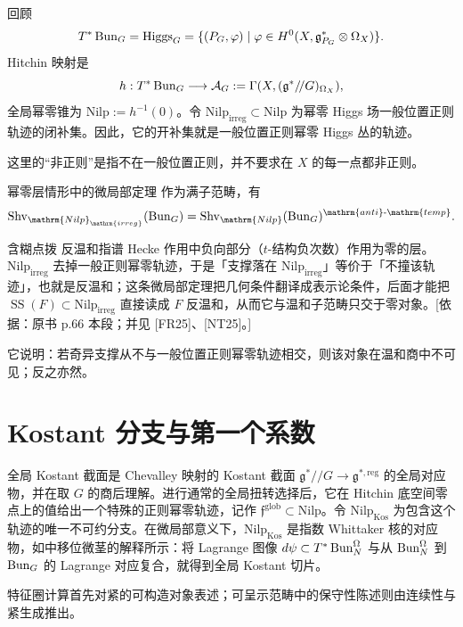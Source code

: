 回顾
\[T^*\operatorname{Bun}_G=\operatorname{Higgs}_G=\{(P_G,\varphi)\mid\varphi\in H^0(X,\mathfrak g_{P_G}^*\otimes\Omega_X)\}.\]
Hitchin 映射是
\[h:T^*\operatorname{Bun}_G\longrightarrow\mathcal{A}_G:=\Gamma(X,(\mathfrak g^*/\!/G)_{\Omega_X}),\]
全局幂零锥为 $\mathrm{Nilp}:=h^{-1}(0)$。令 $\mathrm{Nilp}_{\mathrm{irreg}}\subset\mathrm{Nilp}$ 为幂零 Higgs 场一般位置正则轨迹的闭补集。因此，它的开补集就是一般位置正则幂零 Higgs 丛的轨迹。
\begin{note}
这里的“非正则”是指不在一般位置正则，并不要求在 $X$ 的每一点都非正则。
\end{note}
\begin{theorem*}{幂零层情形中的微局部定理\cite{FR25,NT25}}
作为满子范畴，有
\[\Shv_{\mathrm{Nilp}_{\mathrm{irreg}}}(\Bun_G)=\Shv_{\mathrm{Nilp}}(\Bun_G)^{\mathrm{anti}\text{-}\mathrm{temp}}.\]

\begin{transnote}{含糊点拨}
反温和指谱 Hecke 作用中负向部分（$t$-结构负次数）作用为零的层。$\mathrm{Nilp}_{\mathrm{irreg}}$ 去掉一般正则幂零轨迹，于是「支撑落在 $\mathrm{Nilp}_{\mathrm{irreg}}$」等价于「不撞该轨迹」，也就是反温和；这条微局部定理把几何条件翻译成表示论条件，后面才能把 $\operatorname{SS}(F)\subset\mathrm{Nilp}_{\mathrm{irreg}}$ 直接读成 $F$ 反温和，从而它与温和子范畴只交于零对象。[依据：原书 p.66 本段；并见 [FR25]、[NT25]。]
\end{transnote}
\end{theorem*}
它说明：若奇异支撑从不与一般位置正则幂零轨迹相交，则该对象在温和商中不可见；反之亦然。

\section{Kostant 分支与第一个系数}\label{sec:13.5}
全局 Kostant 截面是 Chevalley 映射的 Kostant 截面 $\mathfrak g^*/\!/G\to\mathfrak g^{*,\mathrm{reg}}$ 的全局对应物，并在取 $G$ 的商后理解。进行通常的全局扭转选择后，它在 Hitchin 底空间零点上的值给出一个特殊的正则幂零轨迹，记作 $\mathfrak f^{\mathrm{glob}}\subset\mathrm{Nilp}$。令 $\mathrm{Nilp}_{\mathrm{Kos}}$ 为包含这个轨迹的唯一不可约分支。在微局部意义下，$\mathrm{Nilp}_{\mathrm{Kos}}$ 是指数 Whittaker 核的对应物，如\cite{NT25}中移位微茎的解释所示：将 Lagrange 图像 $d\psi\subset T^*\operatorname{Bun}_N^\Omega$ 与从 $\operatorname{Bun}_N^\Omega$ 到 $\operatorname{Bun}_G$ 的 Lagrange 对应复合，就得到全局 Kostant 切片。

特征圈计算首先对紧的可构造对象表述；可呈示范畴中的保守性陈述则由连续性与紧生成推出。


